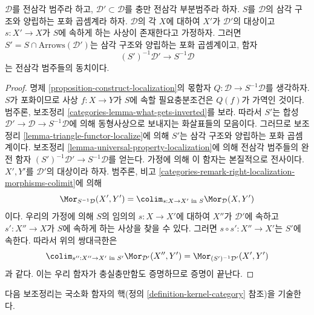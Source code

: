 \begin{lemma}
\label{lemma-localization-subcategory}
$\mathcal{D}$를 전삼각 범주라 하고,
$\mathcal{D}' \subset \mathcal{D}$를 충만 전삼각 부분범주라 하자.
$S$를 $\mathcal{D}$의 삼각 구조와 양립하는 포화 곱셈계라 하자.
$\mathcal{D}$의 각 $X$에 대하여 $X'$가 $\mathcal{D}'$의 대상이고
$s : X' \to X$가 $S$에 속하게 하는 사상이 존재한다고 가정하자.
그러면 $S' = S \cap \text{Arrows}(\mathcal{D}')$는 삼각 구조와
양립하는 포화 곱셈계이고, 함자
$$
(S')^{-1}\mathcal{D}' \longrightarrow S^{-1}\mathcal{D}
$$
는 전삼각 범주들의 동치이다.
\end{lemma}

\begin{proof}
명제 \ref{proposition-construct-localization}의 몫함자
$Q : \mathcal{D} \to S^{-1}\mathcal{D}$를 생각하자.
$S$가 포화이므로 사상 $f : X \to Y$가 $S$에 속할 필요충분조건은
$Q(f)$가 가역인 것이다. 범주론, 보조정리
\ref{categories-lemma-what-gets-inverted}를 보라. 따라서 $S'$는
합성 $\mathcal{D}' \to \mathcal{D} \to S^{-1}\mathcal{D}$에 의해
동형사상으로 보내지는 화살표들의 모음이다. 그러므로 보조정리
\ref{lemma-triangle-functor-localize}에 의해 $S'$는 삼각 구조와
양립하는 포화 곱셈계이다.
보조정리 \ref{lemma-universal-property-localization}에 의해 전삼각
범주들의 완전 함자 $(S')^{-1}\mathcal{D}' \to S^{-1}\mathcal{D}$를
얻는다. 가정에 의해 이 함자는 본질적으로 전사이다.
$X', Y'$를 $\mathcal{D}'$의 대상이라 하자. 범주론, 비고
\ref{categories-remark-right-localization-morphisms-colimit}에 의해
$$
\Mor_{S^{-1}\mathcal{D}}(X', Y') =
\colim_{s : X \to X'\text{ in }S} \Mor_\mathcal{D}(X, Y')
$$
이다. 우리의 가정에 의해 $S$의 임의의 $s : X \to X'$에 대하여
$X''$가 $\mathcal{D}'$에 속하고 $s' : X'' \to X$가 $S$에 속하게 하는
사상을 찾을 수 있다. 그러면
$s \circ s' : X'' \to X'$는 $S'$에 속한다. 따라서 위의 쌍대극한은
$$
\colim_{s'' : X'' \to X'\text{ in }S'} \Mor_{\mathcal{D}'}(X'', Y') =
\Mor_{(S')^{-1}\mathcal{D}'}(X', Y')
$$
과 같다. 이는 우리 함자가 충실충만함도 증명하므로 증명이 끝난다.
\end{proof}

\noindent
다음 보조정리는 국소화 함자의 핵(정의
\ref{definition-kernel-category} 참조)을 기술한다.

